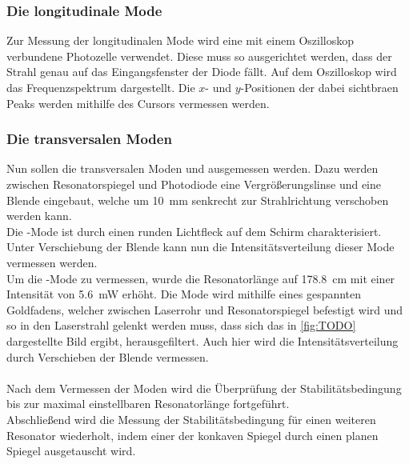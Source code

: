 \subsubsection{Die longitudinale Mode}

    Zur Messung der longitudinalen Mode wird eine mit einem Oszilloskop verbundene Photozelle verwendet.
    Diese muss so ausgerichtet werden,
    dass der Strahl genau auf das Eingangsfenster der Diode fällt.
    Auf dem Oszilloskop wird das Frequenzspektrum dargestellt.
    Die $x$- und $y$-Positionen der dabei sichtbraen Peaks
    werden mithilfe des Cursors vermessen werden.


\subsubsection{Die transversalen Moden}

    Nun sollen die transversalen Moden  und  ausgemessen werden.
    Dazu werden zwischen Resonatorspiegel und Photodiode eine Vergrößerungslinse und eine Blende eingebaut,
    welche um \SI{10}{\milli\meter} senkrecht zur Strahlrichtung verschoben werden kann.\\
    Die -Mode ist durch einen runden Lichtfleck auf dem Schirm charakterisiert.
    Unter Verschiebung der Blende kann nun die Intensitätsverteilung dieser Mode vermessen werden.\\
    Um die -Mode zu vermessen,
    wurde die Resonatorlänge auf \SI{178.8}{\centi\meter} mit einer Intensität von \SI{5.6}{\milli\watt} erhöht.
    Die Mode wird mithilfe eines gespannten Goldfadens,
    welcher zwischen Laserrohr und Resonatorspiegel befestigt wird und so in den Laserstrahl gelenkt werden muss,
    dass sich das in \autoref{fig:TODO} dargestellte Bild ergibt,
    herausgefiltert.
    Auch hier wird die Intensitätsverteilung durch Verschieben der Blende vermessen.\\
    \\
    Nach dem Vermessen der Moden wird die Überprüfung der Stabilitätsbedingung bis zur maximal einstellbaren Resonatorlänge fortgeführt.\\
    Abschließend wird die Messung der Stabilitätsbedingung für einen weiteren Resonator wiederholt,
    indem einer der konkaven Spiegel durch einen planen Spiegel ausgetauscht wird.
